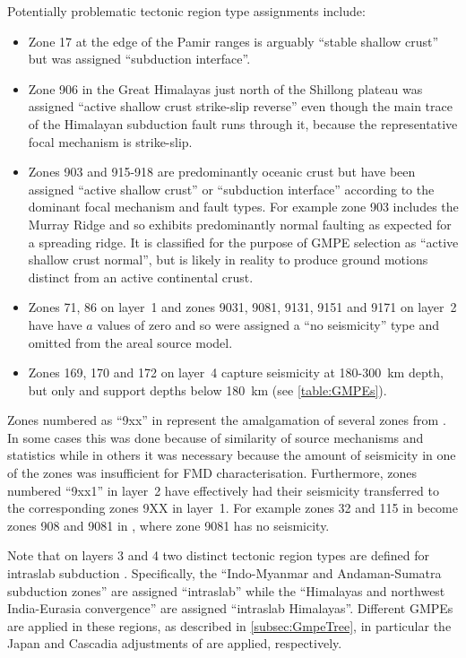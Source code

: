 \documentclass{article}
\begin{document}
Potentially problematic tectonic region type assignments include:
\begin{itemize}
\item Zone 17 at the edge of the Pamir ranges is arguably ``stable shallow crust'' but was assigned ``subduction interface''.
\item Zone 906 in the Great Himalayas just north of the Shillong plateau was assigned ``active shallow crust strike-slip reverse'' even though the main trace of the Himalayan subduction fault runs through it, because the representative focal mechanism is strike-slip.
\item Zones 903 and 915-918 are predominantly oceanic crust but have been assigned ``active shallow crust'' or ``subduction interface'' according to the dominant focal mechanism and fault types.
For example zone 903 includes the Murray Ridge and so exhibits predominantly normal faulting as expected for a spreading ridge.
It is classified for the purpose of GMPE selection as ``active shallow crust normal'', but is likely in reality to produce ground motions distinct from an active continental crust.
\item Zones 71, 86 on layer~1 and zones 9031, 9081, 9131, 9151 and 9171 on layer~2 have have $a$ values of zero and so were assigned a ``no seismicity'' type and omitted from the areal source model.
\item Zones 169, 170 and 172 on layer~4 capture seismicity at 180-300~km depth, but only \cite{youngs1997strong} and \cite{kanno2006new} support depths below 180~km (see \autoref{table:GMPEs}).
\end{itemize}

Zones numbered as ``9xx'' in \cite{nath2012probabilistic} represent the amalgamation of several zones from \cite{thingbaijam2011seismogenic}.
In some cases this was done because of similarity of source mechanisms and statistics while in others it was necessary because the amount of seismicity in one of the zones was insufficient for FMD characterisation.
Furthermore, zones numbered ``9xx1'' in layer~2 have effectively had their seismicity transferred to the corresponding zones 9XX in layer~1.
For example zones 32 and 115 in \cite{thingbaijam2011seismogenic} become zones 908 and 9081 in \cite{nath2012probabilistic}, where zone 9081 has no seismicity.

Note that on layers 3 and 4 two distinct tectonic region types are defined for intraslab subduction \citep[p.
137]{nath2012probabilistic}.
Specifically, the ``Indo-Myanmar and Andaman-Sumatra subduction zones'' are assigned ``intraslab'' while the ``Himalayas and northwest India-Eurasia convergence'' are assigned ``intraslab Himalayas''.
Different GMPEs are applied in these regions, as described in \autoref{subsec:GmpeTree}, in particular the Japan and Cascadia adjustments of \cite{atkinson2003empirical} are applied, respectively.
\end{document}

